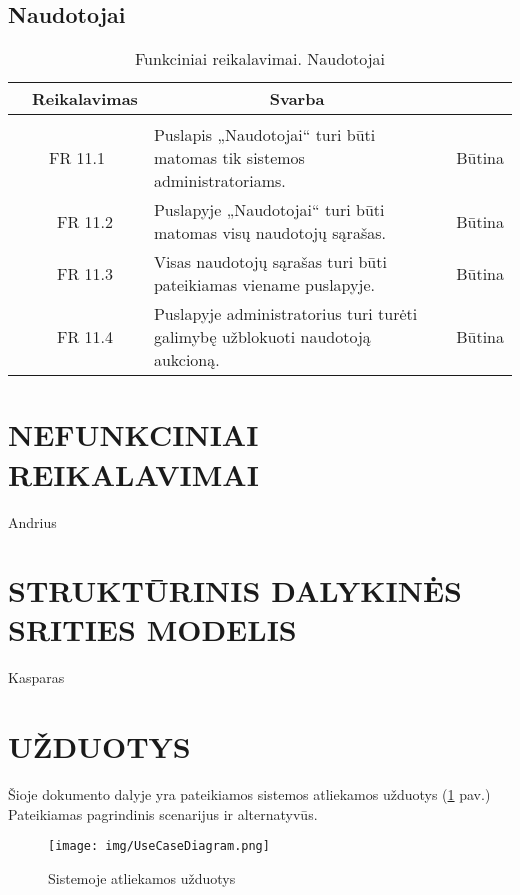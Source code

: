 \documentclass{VUMIFPSkursinis}
\begin{document}
\subsection{Naudotojai}
\begin{table}[H]
	\caption{Funkciniai reikalavimai. Naudotojai}
	\begin{tabular}{|p{1cm}|p{1cm}|p{}|p{}|}
		\hline 
		\rowcolor{gray!50}
		\multicolumn{2}{|c|}{{\bfseries Kodas}}&
		\multicolumn{1}{c|}{{\bfseries Reikalavimas}}&
		\multicolumn{1}{c|}{{\bfseries Svarba}}\\
		\hline
		\rowcolor{lightgray}
		\multicolumn{4}{|c|}{Naudotojai}\\				
		\hline
		\multicolumn{2}{|c|}{FR 11.1}&
		{Puslapis „Naudotojai“ turi būti matomas tik sistemos administratoriams.
		}&		
		\multicolumn{1}{c|}{Būtina}\\
		\hline
		\multicolumn{1}{|c}{}&
		\multicolumn{1}{c|}{FR 11.2}&
		{Puslapyje „Naudotojai“ turi būti matomas visų naudotojų sąrašas.
		}&		
		\multicolumn{1}{c|}{Būtina}\\
		\hline	
		\multicolumn{1}{|c}{}&
		\multicolumn{1}{c|}{FR 11.3}&
		{Visas naudotojų sąrašas turi būti pateikiamas viename puslapyje.
		}&
		\multicolumn{1}{c|}{Būtina}\\									
		\hline
		\multicolumn{1}{|c}{}&
		\multicolumn{1}{c|}{FR 11.4}&
		{Puslapyje administratorius turi turėti galimybę užblokuoti naudotoją aukcioną.
		}&
		\multicolumn{1}{c|}{Būtina}\\									
		\hline
	\end{tabular}		
\end{table}

\section{NEFUNKCINIAI REIKALAVIMAI}
Andrius
\newpage
\section{STRUKTŪRINIS DALYKINĖS SRITIES MODELIS}
Kasparas
\newpage
\section{UŽDUOTYS}
Šioje dokumento dalyje yra pateikiamos sistemos atliekamos užduotys  (\ref{fig:usecase} pav.) Pateikiamas pagrindinis scenarijus ir alternatyvūs.\\
\begin{figure}[H]
\centering
\texttt{[image: img/UseCaseDiagram.png]}
\label{fig:usecase}
\caption{Sistemoje atliekamos užduotys}
\end{figure}
\end{document}
